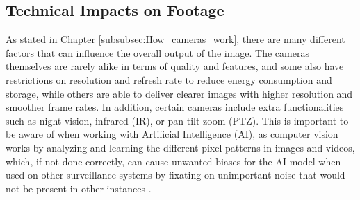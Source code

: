 \subsection{Technical Impacts on Footage}
As stated in Chapter \ref{subsubsec:How_cameras_work}, there are many different factors that can influence the overall output of the image. The cameras themselves are rarely alike in terms of quality and features, and some also have restrictions on resolution and refresh rate to reduce energy consumption and storage, while others are able to deliver clearer images with higher resolution and smoother frame rates. In addition, certain cameras include extra functionalities such as night vision, infrared (\acs{IR}), or pan tilt-zoom (\acs{PTZ})\cite{nightvision_enhancement2018}. This is important to be aware of when working with Artificial Intelligence (\acs{AI}), as computer vision works by analyzing and learning the different pixel patterns in images and videos\cite{common_challenges_image_class2024}, which, if not done correctly, can cause unwanted biases for the \acs{AI}-model when used on other surveillance systems by fixating on unimportant noise that would not be present in other instances \cite{opencv2025visionproblems}.

